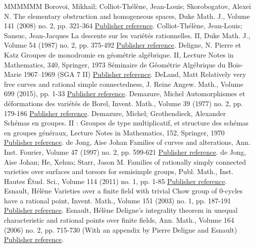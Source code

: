 \begin{thebibliography}{MMMMMM}
 Borovoi, Mikhail; Colliot-Thélène, Jean-Louis; Skorobogatov, Alexei N. The elementary obstruction and homogeneous spaces, Duke Math. J., Volume 141 (2008) no. 2, pp. 321-364 \href{https://ahl.centre-mersenne.org/item/AHL_2020__3__1399_0/#BCTSk}{Publisher reference}.
 Colliot-Thélène, Jean-Louis; Sansuc, Jean-Jacques La descente sur les variétés rationnelles. II, Duke Math. J., Volume 54 (1987) no. 2, pp. 375-492 \href{https://ahl.centre-mersenne.org/item/AHL_2020__3__1399_0/#CTSansuc}{Publisher reference}.
 Deligne, N. Pierre et Katz Groupes de monodromie en géométrie algébrique. II, Lecture Notes in Mathematics, 340, Springer, 1973 Séminaire de Géométrie Algébrique du Bois-Marie 1967–1969 (SGA 7 II) \href{https://ahl.centre-mersenne.org/item/AHL_2020__3__1399_0/#SGA7II}{Publisher reference}.
 DeLand, Matt Relatively very free curves and rational simple connectedness, J. Reine Angew. Math., Volume 699 (2015), pp. 1-33 \href{https://ahl.centre-mersenne.org/item/AHL_2020__3__1399_0/#DeLand}{Publisher reference}.
 Demazure, Michel Automorphismes et déformations des variétés de Borel, Invent. Math., Volume 39 (1977) no. 2, pp. 179-186 \href{https://ahl.centre-mersenne.org/item/AHL_2020__3__1399_0/#Demazure-Aut}{Publisher reference}.
 Demazure, Michel; Grothendieck, Alexander Schémas en groupes. II : Groupes de type multiplicatif, et structure des schémas en groupes généraux, Lecture Notes in Mathematics, 152, Springer, 1970 \href{https://ahl.centre-mersenne.org/item/AHL_2020__3__1399_0/#SGA3II}{Publisher reference}.
 de Jong, Aise Johan Families of curves and alterations, Ann. Inst. Fourier, Volume 47 (1997) no. 2, pp. 599-621 \href{https://ahl.centre-mersenne.org/item/AHL_2020__3__1399_0/#dJalter}{Publisher reference}.
 de Jong, Aise Johan; He, Xehua; Starr, Jason M. Families of rationally simply connected varieties over surfaces and torsors for semisimple groups, Publ. Math., Inst. Hautes Étud. Sci., Volume 114 (2011) no. 1, pp. 1-85 \href{https://ahl.centre-mersenne.org/item/AHL_2020__3__1399_0/#dJHS}{Publisher reference}.
 Esnault, Hélène Varieties over a finite field with trivial Chow group of 0-cycles have a rational point, Invent. Math., Volume 151 (2003) no. 1, pp. 187-191 \href{https://ahl.centre-mersenne.org/item/AHL_2020__3__1399_0/#Esnault}{Publisher reference}.
 Esnault, Hélène Deligne’s integrality theorem in unequal characteristic and rational points over finite fields, Ann. Math., Volume 164 (2006) no. 2, pp. 715-730 (With an appendix by Pierre Deligne and Esnault) \href{https://ahl.centre-mersenne.org/item/AHL_2020__3__1399_0/#Esnault_integrality}{Publisher reference}.

\end{thebibliography}
